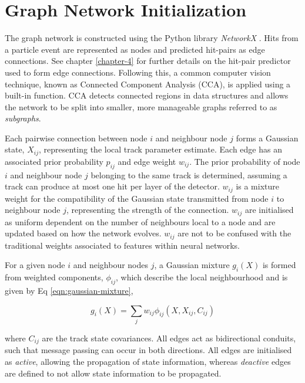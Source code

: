 \section{Graph Network Initialization}
\label{gnn-network-initialization}

The graph network is constructed using the Python library \textit{NetworkX} \cite{SciPyProceedings_11}. Hits from a particle event are represented as nodes and predicted hit-pairs as edge connections. See chapter \ref{chapter-4} for further details on the hit-pair predictor used to form edge connections. Following this, a common computer vision technique, known as Connected Component Analysis (CCA), is applied using a built-in function\cite{networkx}. CCA detects connected regions in data structures and allows the network to be split into smaller, more manageable graphs referred to as \textit{subgraphs}. 

Each pairwise connection between node $i$ and neighbour node $j$ forms a Gaussian state, $X_{ij}$, representing the local track parameter estimate. Each edge has an associated prior probability $p_{ij}$ and edge weight $w_{ij}$. The prior probability of node $i$ and neighbour node $j$ belonging to the same track is determined, assuming a track can produce at most one hit per layer of the detector. $w_{ij}$ is a mixture weight for the compatibility of the Gaussian state transmitted from node $i$ to neighbour node $j$, representing the strength of the connection. $w_{ij}$ are initialised as uniform dependent on the number of neighbours local to a node and are updated based on how the network evolves. $w_{ij}$ are not to be confused with the traditional weights associated to features within neural networks.

For a given node $i$ and neighbour nodes $j$, a Gaussian mixture $g_i(X)$ is formed from weighted components, $\phi_{ij}$, which describe the local neighbourhood and is given by Eq \eqref{eqn:gaussian-mixture},

\begin{equation}
g_i(X) = \sum_{j} w_{ij}\phi_{ij}(X, X_{ij}, C_{ij})
\label{eqn:gaussian-mixture}
\end{equation}

where $C_{ij}$ are the track state covariances. All edges act as bidirectional conduits, such that message passing can occur in both directions. All edges are initialised as \textit{active}, allowing the propagation of state information, whereas \textit{deactive} edges are defined to not allow state information to be propagated. 

